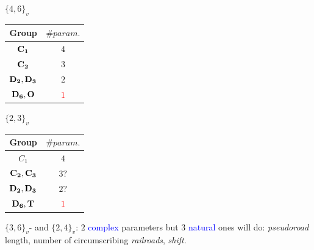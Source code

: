 \documentclass{beamer}
\begin{document}
\begin{frame}
{\begin{minipage}{4.5cm}
\centering  
$\{4,6\}_v$\par
\begin{tabular}{||c|c||}
\hline\hline
Group  & $\# param.$\\   
\hline\hline   
${\bf C_1}$  & $4$\\
${\bf C_2}$  & $3$\\
${\bf D_2,D_3}$  & $2$\\
${\bf D_6,O}$    & \textcolor{red}{$1$}\\
\hline\hline
\end{tabular}  
\end{minipage}
\begin{minipage}{4.5cm}
\centering 
$\{2,3\}_v$\par
\begin{tabular}{||c|c||}
\hline\hline   
Group  & $\# param.$\\  
\hline\hline  
{\bf $C_1$}  & $4$\\
${\bf C_2,C_3}$  & $3?$\\
${\bf D_2,D_3}$  & $2?$\\
${\bf D_6,T}$    & \textcolor{red}{$1$}\\
\hline\hline
\end{tabular} 
\end{minipage}
}

$\{3,6\}_v$- and $\{2,4\}_v$:  
$2$ \textcolor{blue}{complex} parameters but
$3$ \textcolor{blue}{natural} ones will do: {\em 
pseudoroad} length,  number of  
 circumscribing 
{\em railroads}, {\em shift}.
\end{frame}



\end{document}
